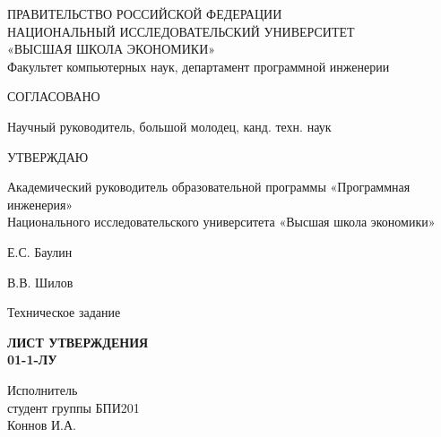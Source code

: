 
ПРАВИТЕЛЬСТВО РОССИЙСКОЙ ФЕДЕРАЦИИ \\
НАЦИОНАЛЬНЫЙ ИССЛЕДОВАТЕЛЬСКИЙ УНИВЕРСИТЕТ \\
«ВЫСШАЯ ШКОЛА ЭКОНОМИКИ» \\
Факультет компьютерных наук, департамент программной инженерии

\bigskip

\begin{minipage}[t]{0.45\textwidth}\centering
	СОГЛАСОВАНО
	
	Научный руководитель,
	большой молодец,
	канд. техн. наук
\end{minipage}%
\hfil%
\begin{minipage}[t]{0.45\textwidth}\centering
	УТВЕРЖДАЮ
	
	Академический руководитель
	образовательной программы
	«Программная инженерия»\\
	Национального исследовательского
	университета «Высшая школа экономики»
\end{minipage}

\bigskip


\begin{minipage}[t]{0.45\textwidth}\centering
	\placename Е.С. Баулин \\
	\placedate
\end{minipage}%
\hfil%
\begin{minipage}[t]{0.45\textwidth}\centering
	\placename В.В. Шилов \\
	\placedate
\end{minipage}%

\vskip 1.5cm

\textbf{\uppercase{\docTitle}}
\bigskip

\bigskip
Техническое задание
\bigskip

\textbf{
	\Large
		ЛИСТ УТВЕРЖДЕНИЯ \\
	\large
		{\docId} 01-1-ЛУ
}

\vspace{3cm}
\begin{flushright}
\begin{varwidth}{\linewidth}\centering
	Исполнитель \\
	студент группы БПИ201 \\
	\placename Коннов И.А. \\
	\placedate
\end{varwidth}
\end{flushright}

\vfill
\textbf{\YEAR}